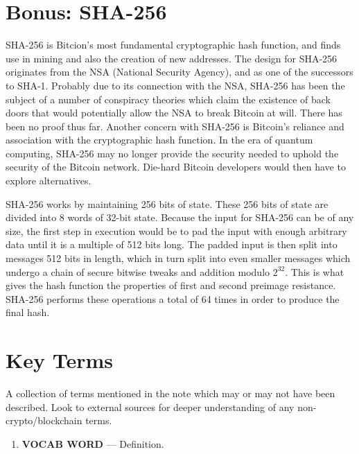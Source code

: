\documentclass[full.tex]{subfiles}
\begin{document}
   \section*{Bonus: SHA-256}
   
   SHA-256 is Bitcion's most fundamental cryptographic hash function, and finds use in mining and also the creation of new addresses. The design for SHA-256 originates from the NSA (National Security Agency), and as one of the successors to SHA-1. Probably due to its connection with the NSA, SHA-256 has been the subject of a number of conspiracy theories which claim the existence of back doors that would potentially allow the NSA to break Bitcoin at will. There has been no proof thus far. Another concern with SHA-256 is Bitcoin's reliance and association with the cryptographic hash function. In the era of quantum computing, SHA-256 may no longer provide the security needed to uphold the security of the Bitcoin network. Die-hard Bitcoin developers would then have to explore alternatives.
   
   SHA-256 works by maintaining 256 bits of state. These 256 bits of state are divided into 8 words of 32-bit state. Because the input for SHA-256 can be of any size, the first step in execution would be to pad the input with enough arbitrary data until it is a multiple of 512 bits long. The padded input is then split into messages 512 bits in length, which in turn split into even smaller messages which undergo a chain of secure bitwise tweaks and addition modulo $2^{32}$. This is what gives the hash function the properties of first and second preimage resistance. SHA-256 performs these operations a total of 64 times in order to produce the final hash.
   
    
    
    \newpage
    \thispagestyle{firstpage}
    \vspace*{2\baselineskip}
    \section*{Key Terms}
    \noindent A collection of terms mentioned in the note which may or may not have been described. Look to external sources for deeper understanding of any non-crypto/blockchain terms.
    \begin{enumerate}
        \item \textbf{VOCAB WORD} --- Definition. %
    \end{enumerate}
\end{document}
